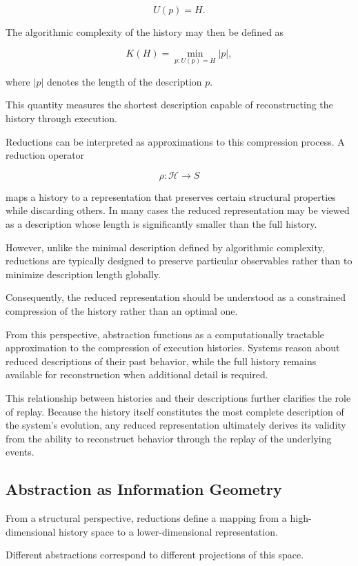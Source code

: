 \documentclass[12pt]{article}
\begin{document}
\[
U(p) = H.
\]

The algorithmic complexity of the history may then be
defined as

\[
K(H) = \min_{p : U(p) = H} |p|,
\]

where $|p|$ denotes the length of the description $p$.

This quantity measures the shortest description capable
of reconstructing the history through execution.

Reductions can be interpreted as approximations to this
compression process. A reduction operator

\[
\rho : \mathcal{H} \rightarrow S
\]

maps a history to a representation that preserves
certain structural properties while discarding others.
In many cases the reduced representation may be viewed
as a description whose length is significantly smaller
than the full history.

However, unlike the minimal description defined by
algorithmic complexity, reductions are typically
designed to preserve particular observables rather
than to minimize description length globally.

Consequently, the reduced representation should be
understood as a constrained compression of the history
rather than an optimal one.

From this perspective, abstraction functions as a
computationally tractable approximation to the
compression of execution histories. Systems reason
about reduced descriptions of their past behavior,
while the full history remains available for
reconstruction when additional detail is required.

This relationship between histories and their
descriptions further clarifies the role of replay.
Because the history itself constitutes the most
complete description of the system's evolution,
any reduced representation ultimately derives its
validity from the ability to reconstruct behavior
through the replay of the underlying events.

\subsection{Abstraction as Information Geometry}

From a structural perspective, reductions define a
mapping from a high-dimensional history space
to a lower-dimensional representation.

Different abstractions correspond to different
projections of this space.
\end{document}
